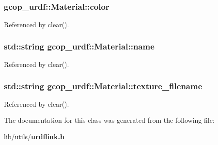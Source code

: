 \subsubsection[{color}]{ {\bf gcop\-\_\-urdf\-::\-Material\-::color}}\label{classgcop__urdf_1_1Material_aa5028ae4079e0d2fbb771931e3a1214b}


\-Referenced by clear().

\subsubsection[{name}]{\setlength{\rightskip}{0pt plus 5cm}std\-::string {\bf gcop\-\_\-urdf\-::\-Material\-::name}}\label{classgcop__urdf_1_1Material_a342fcdada2cb754dc1620e204a2864d1}


\-Referenced by clear().

\subsubsection[{texture\-\_\-filename}]{\setlength{\rightskip}{0pt plus 5cm}std\-::string {\bf gcop\-\_\-urdf\-::\-Material\-::texture\-\_\-filename}}\label{classgcop__urdf_1_1Material_a94fb5d69eac5db02661371a2e5d22d67}


\-Referenced by clear().



\-The documentation for this class was generated from the following file\-:\begin{DoxyCompactItemize}
\item 
lib/utils/{\bf urdflink.\-h}\end{DoxyCompactItemize}

